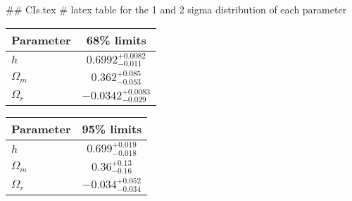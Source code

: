 ## CIs.tex
# latex table for the 1 and 2 sigma distribution of each parameter

\begin{tabular} { l  c}
 Parameter &  68\% limits\\
\hline
{\boldmath$h              $} & $0.6992^{+0.0082}_{-0.011} $\\
{\boldmath$\Omega_m       $} & $0.362^{+0.085}_{-0.053}   $\\
{\boldmath$\Omega_r       $} & $-0.0342^{+0.0083}_{-0.029}$\\
\hline
\end{tabular}

\begin{tabular} { l  c}
 Parameter &  95\% limits\\
\hline
{\boldmath$h              $} & $0.699^{+0.019}_{-0.018}   $\\
{\boldmath$\Omega_m       $} & $0.36^{+0.13}_{-0.16}      $\\
{\boldmath$\Omega_r       $} & $-0.034^{+0.052}_{-0.034}  $\\
\hline
\end{tabular}
